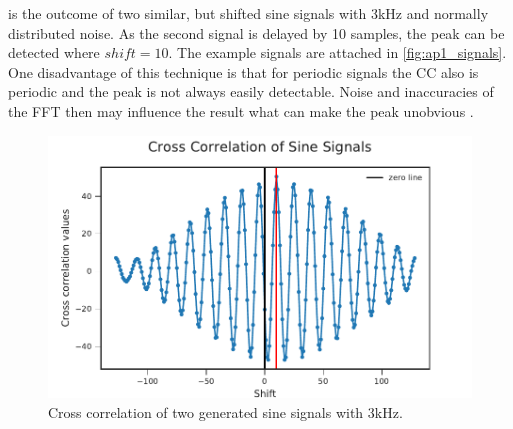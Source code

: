  is the outcome of two similar, but shifted sine signals with
3\si{\kilo\hertz} and normally distributed noise.
As the second signal is delayed by 10 samples, the peak can be detected where $shift = 10$.
The example signals are attached in \cref{fig:ap1_signals}.
One disadvantage of this technique is that for periodic signals the \ac{CC} also is periodic
and the peak is not always easily detectable. Noise and inaccuracies of the \ac{FFT} then
may influence the result what can make the peak unobvious \cite{L_L_GCC}.
\begin{figure}[ht]
	\centering
		\includegraphics[width=1\columnwidth]{figures/CC_theory}
	\caption{Cross correlation of two generated sine signals with 3\si{\kilo\hertz}.}
    \label{fig:03_ccTheory}
\end{figure}
